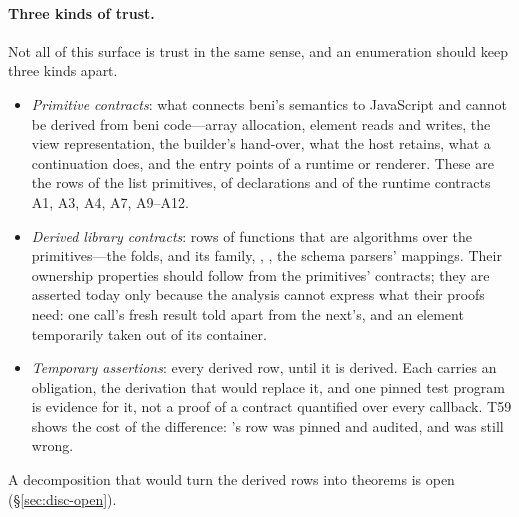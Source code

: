 \paragraph{Three kinds of trust.} Not all of this surface is trust in the same sense, and an enumeration
should keep three kinds apart.
\begin{itemize}
\item \emph{Primitive contracts}: what connects beni's semantics to JavaScript and cannot be derived from
beni code---array allocation, element reads and writes, the view representation, the builder's hand-over,
what the host retains, what a continuation does, and the entry points of a runtime or renderer. These are
the rows of the list primitives, of  declarations and of the runtime contracts A1, A3, A4,
A7, A9--A12.
\item \emph{Derived library contracts}: rows of functions that are algorithms over the primitives---the
folds,  and its family, , , the schema parsers' mappings. Their
ownership properties should follow from the primitives' contracts; they are asserted today only because
the analysis cannot express what their proofs need: one call's fresh result told apart from the next's,
and an element temporarily taken out of its container.
\item \emph{Temporary assertions}: every derived row, until it is derived. Each carries an obligation, the
derivation that would replace it, and one pinned test program is evidence for it, not a proof of a
contract quantified over every callback. T59 shows the cost of the difference: 's row was
pinned and audited, and was still wrong.
\end{itemize}
A decomposition that would turn the derived rows into theorems is open (\S\ref{sec:disc-open}).

